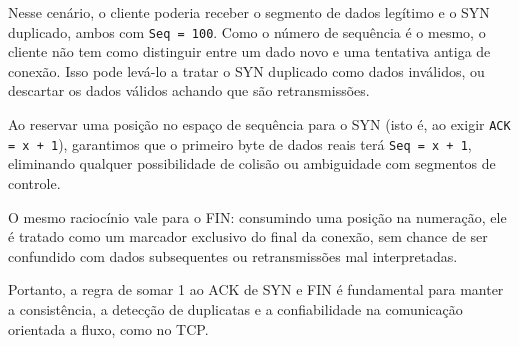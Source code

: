 Nesse cenário, o cliente poderia receber o segmento de dados legítimo e o SYN duplicado, ambos com \texttt{Seq = 100}. Como o número de sequência é o mesmo, o cliente não tem como distinguir entre um dado novo e uma tentativa antiga de conexão. Isso pode levá-lo a tratar o SYN duplicado como dados inválidos, ou descartar os dados válidos achando que são retransmissões.

Ao reservar uma posição no espaço de sequência para o SYN (isto é, ao exigir \texttt{ACK = x + 1}), garantimos que o primeiro byte de dados reais terá \texttt{Seq = x + 1}, eliminando qualquer possibilidade de colisão ou ambiguidade com segmentos de controle.

O mesmo raciocínio vale para o FIN: consumindo uma posição na numeração, ele é tratado como um marcador exclusivo do final da conexão, sem chance de ser confundido com dados subsequentes ou retransmissões mal interpretadas.

Portanto, a regra de somar 1 ao ACK de SYN e FIN é fundamental para manter a consistência, a detecção de duplicatas e a confiabilidade na comunicação orientada a fluxo, como no TCP.


